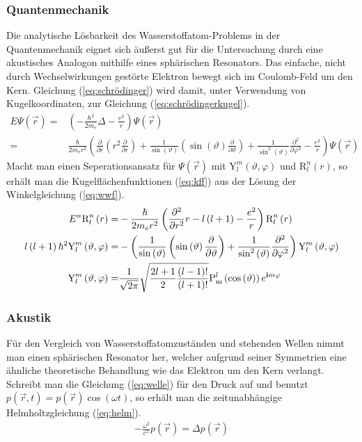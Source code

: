 \documentclass[numbers=noenddot,12pt,a4paper]{scrartcl}
\newcommand{\ix}[1]{_\text{#1}}
\newcommand{\imag}{\mathbf{i}}
\newcommand{\euler}{\mathnormal{e}}
\newcommand{\wellenfunktiont}{\Psi\left(\vec{r}\right)}
\newcommand{\winkel}{\text{Y}^{m}_{l}\left(\vartheta,\varphi\right)}
\newcommand{\radial}{\text{R}^{n}_{l}\left(r\right)}
\begin{document}
\subsubsection{Quantenmechanik} \label{subsec:wasserstoff}
Die analytische Lösbarkeit des Wasserstoffatom-Problems in der Quantenmechanik eignet sich äußerst gut für die Untersuchung durch eine akustisches Analogon mithilfe eines sphärischen Resonators. Das einfache, nicht durch Wechselwirkungen gestörte Elektron bewegt sich im Coulomb-Feld um den Kern. Gleichung (\ref{eq:schrödinger}) wird damit, unter Verwendung von Kugelkoordinaten, zur Gleichung (\ref{eq:schrödingerkugel}).
\begin{align}
	E\Psi\left(\vec{r}\right)=&\left(-\frac{\hbar^2}{2 m_e}\Delta-\frac{e^2}{r}\right)\Psi\left(\vec{r}\right) \nonumber \\
	=&\frac{\hbar}{2m_e r^2}\left(\frac{\partial}{\partial r}\left(r^2\frac{\partial}{\partial r}\right)+\frac{1}{\sin\left(\vartheta\right)}\left(\sin\left(\vartheta\right)\frac{\partial}{\partial \vartheta}\right)+\frac{1}{\sin^2\left(\vartheta\right)}\frac{\partial^2}{\partial \varphi^2} -\frac{e^2}{r}\right)\wellenfunktiont  \label{eq:schrödingerkugel} 
	\end{align}
Macht man einen Seperationsansatz für $\wellenfunktiont$ mit $\winkel$ und $\radial$, so erhält man die Kugelflächenfunktionen (\ref{eq:kff}) aus der Lösung der Winkelgleichung (\ref{eq:wwf}).
\begin{align}
	E^{n}\radial=&-\frac{\hbar}{2m_e r^2}\left(\frac{\partial^2}{\partial r^2}r -l\left(l+1\right)-\frac{e^2}{r}\right)\radial \label{eq:radi} \\ l\left(l+1\right)\hbar^2\winkel=&-\left(\frac{1}{\sin\left(\vartheta\right)}\left(\sin\left(\vartheta\right)\frac{\partial}{\partial \vartheta}\right)+\frac{1}{\sin^2\left(\vartheta\right)}\frac{\partial^2}{\partial \varphi^2}\right)\winkel \label{eq:wwf} \\
	\winkel=&\frac{1}{\sqrt{2\pi}}\sqrt{\frac{2l+1}{2}\frac{\left(l-1\right)!}{\left(l+1\right)!}}\text{P}^{l}\ix{m}\left(\cos\left(\vartheta\right)\right)\euler^{\imag m\varphi} \label{eq:kff}
\end{align}
\subsubsection{Akustik}
Für den Vergleich von Wasserstoffatomzuständen und stehenden Wellen nimmt man einen sphärischen Resonator her, welcher aufgrund seiner Symmetrien eine ähnliche theoretische Behandlung wie das Elektron um den Kern verlangt.\\
Schreibt man die Gleichung (\ref{eq:welle}) für den Druck auf und benutzt $p\left(\vec{r},t\right)=p\left(\vec{r}\right)\cos\left(\omega t\right)$, so erhält man die zeitunabhängige Helmholtzgleichung (\ref{eq:helm}).
\begin{align}
	-\frac{\omega^2}{c^2} p\left(\vec{r}\right)=\Delta p\left(\vec{r}\right) \label{eq:helm}
\end{align}
\end{document}
